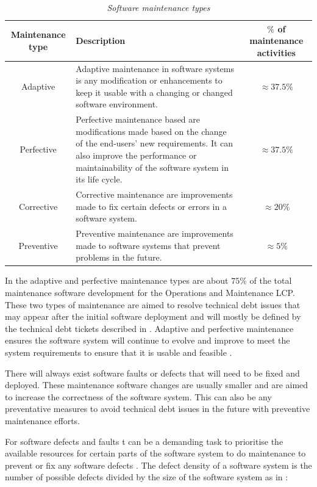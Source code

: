 \begin{table}[!htb]
	\centering
	\caption[Software maintenance types]
	{\textit{Software maintenance types \cite{Ping2010,Hasan2012}}}
	\label{tbl:ch1_maintenanceTypes}
	\begin{tabularx}{\textwidth}{|c|X|c|}
		\hline
		\textbf{Maintenance type} & \textbf{Description} & \textbf{$\%$ of maintenance activities} \\ \hline
		Adaptive & \raggedright Adaptive maintenance in software systems is any modification or enhancements to keep it usable with a changing or changed software environment. & $\approx 37.5\%$ \\ \hline
		Perfective & \raggedright Perfective maintenance based are modifications made based on the change of the end-users' new requirements. It can also improve the performance or maintainability of the software system in its life cycle. & $\approx 37.5\%$ \\ \hline
		Corrective & \raggedright Corrective maintenance are improvements made to fix certain defects or errors in a software system. & $\approx 20\%$ \\ \hline
		Preventive & \raggedright  Preventive maintenance are improvements made to software systems that prevent problems in the future. & $\approx 5\%$ \\ \hline
	\end{tabularx}
\end{table}

In  the adaptive and perfective maintenance types are about $75\%$ of the total maintenance software development for the Operations and Maintenance LCP. These two types of maintenance are aimed to resolve technical debt issues that may appear after the initial software deployment and will mostly be defined by the technical debt tickets described in . Adaptive and perfective maintenance ensures the software system will continue to evolve and improve to meet the system requirements to ensure that it is usable and feasible \cite{Kumar2013}. \par There will always exist software faults or defects that will need to be fixed and deployed. These maintenance software changes are usually smaller and are aimed to increase the correctness of the software system. This can also be any preventative measures to avoid technical debt issues in the future with preventive maintenance efforts.\par For software defects and faults t can be a demanding task to prioritise the available resources for certain parts of the software system to do maintenance to prevent or fix any software defects \cite{Mamone1994, Hasan2012}.  The defect density of a software system is the number of possible defects divided by the size of the software system as in :

